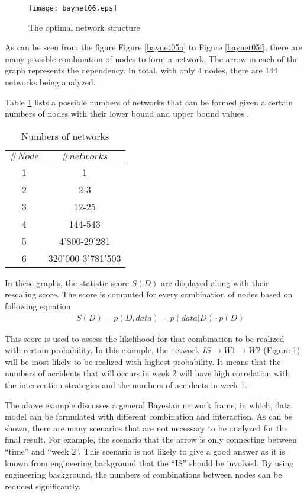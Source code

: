 \begin{figure}[h]
\begin{center}
\texttt{[image: baynet06.eps]}
\caption{The optimal network structure}\label{baynet06}
\end{center}
\end{figure}

As can be seen from the figure Figure \ref{baynet05a} to Figure \ref{baynet05f}, there are many possible combination of nodes to form a network. The arrow in each of the graph represents the dependency. In total, with only 4 nodes, there are 144 networks being analyzed. 

Table \ref{tblbayes6} lists a possible numbers of networks that can be formed given a certain numbers of nodes with their lower bound and upper bound values \citep{Heckerm1996}.

\begin{table}
	\centering
	\caption{Numbers of networks} \label{tblbayes6}
\begin{tabular}{|c|c|}
\hline
$\#Node$ & $\#networks$ \\ 
\hline
1 & 1 \\ 
\hline
2 & 2-3 \\ 
\hline
3 & 12-25 \\ 
\hline
4 & 144-543 \\ 
\hline
5 & 4'800-29'281 \\ 
\hline
6 & 320'000-3'781'503 \\ 
\hline
\end{tabular}
\end{table}

In these graphs, the statistic score $S(D)$ are displayed along with their rescaling score. The score is computed for every combination of nodes based on following equation
\begin{eqnarray}
 && S(D)=p(D,data)=p(data|D)\cdot p(D)
\end{eqnarray}

This score is used to assess the likelihood for that combination to be realized with certain probability. In this example, the network $IS \to W1 \to W2$ (Figure \ref{baynet06}) will be most likely to be realized with highest probability. It means that the numbers of accidents that will occurs in week 2 will have high correlation with the intervention strategies and the numbers of accidents in week 1.

The above example discusses a general Bayesian network frame, in which, data model can be formulated with different combination and interaction. As can be shown, there are many scenarios that are not necessary to be analyzed for the final result. For example, the scenario that the arrow is only connecting between “time” and “week 2”. This scenario is not likely to give a good answer as it is known from engineering background that the “IS” should be involved. By using engineering background, the numbers of combinations between nodes can be reduced significantly. 

